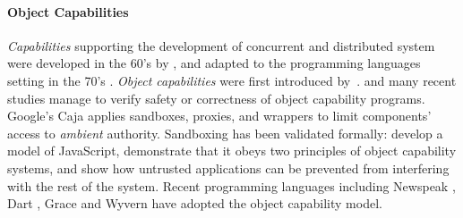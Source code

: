 \paragraph{Object Capabilities} %
{{\em Capabilities} supporting the development of concurrent and distributed system  were developed in the 60's
by \cite{Dennis66}, and adapted to the
programming languages setting in the 70's \cite{JamesMorris}. 
{\em Object capabilities} were first introduced by~\cite{MillerPhD}.
 and many recent %
studies manage
to verify  safety or correctness of object capability programs.
Google's Caja \cite{Caja} applies   sandboxes, proxies, and wrappers
 to limit components'
access to \textit{ambient} authority.
Sandboxing has been validated
formally:  \cite{mmt-oakland10} develop a model of
JavaScript, demonstrate that it obeys two principles of
object capability systems,
and show how untrusted applications can be prevented from interfering with
the rest of the system. 
Recent programming languages %
\cite{CapJavaHayesAPLAS17,CapNetSocc17Eide,DOCaT14} including Newspeak
\cite{newspeak17}, Dart \cite{dart15}, Grace \cite{grace,graceClasses}
and Wyvern \cite{wyverncapabilities} have adopted the object
capability model.

  
}
